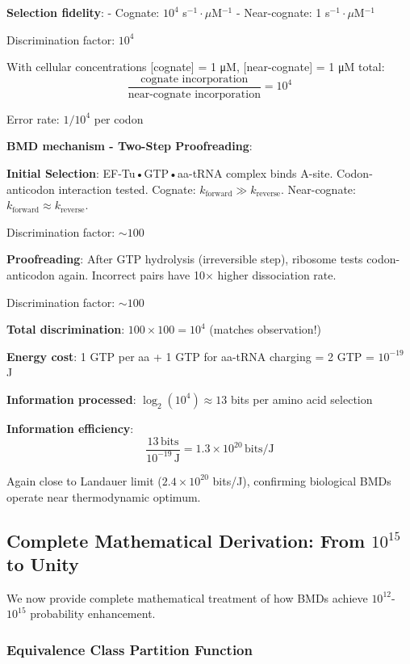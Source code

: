 \documentclass[11pt,onecolumn]{article}
\begin{document}
\textbf{Selection fidelity}:
- Cognate: $10^4$ s$^{-1}\cdot\mu$M$^{-1}$
- Near-cognate: 1 s$^{-1}\cdot\mu$M$^{-1}$

Discrimination factor: $10^4$

With cellular concentrations [cognate] = 1 μM, [near-cognate] = 1 μM total:
\begin{equation}
\frac{\text{cognate incorporation}}{\text{near-cognate incorporation}} = 10^4
\end{equation}

Error rate: $1/10^4$ per codon

\textbf{BMD mechanism - Two-Step Proofreading}:

\textbf{Initial Selection}: EF-Tu•GTP•aa-tRNA complex binds A-site. Codon-anticodon interaction tested. Cognate: $k_{\text{forward}} \gg k_{\text{reverse}}$. Near-cognate: $k_{\text{forward}} \approx k_{\text{reverse}}$.

Discrimination factor: $\sim 100$

\textbf{Proofreading}: After GTP hydrolysis (irreversible step), ribosome tests codon-anticodon again. Incorrect pairs have 10$\times$ higher dissociation rate.

Discrimination factor: $\sim 100$

\textbf{Total discrimination}: $100 \times 100 = 10^4$ (matches observation!)

\textbf{Energy cost}: 1 GTP per aa + 1 GTP for aa-tRNA charging = 2 GTP = $10^{-19}$ J

\textbf{Information processed}: $\log_2(10^4) \approx 13$ bits per amino acid selection

\textbf{Information efficiency}:
\begin{equation}
\frac{13\,\text{bits}}{10^{-19}\,\text{J}} = 1.3 \times 10^{20}\,\text{bits/J}
\end{equation}

Again close to Landauer limit ($2.4 \times 10^{20}$ bits/J), confirming biological BMDs operate near thermodynamic optimum.

\subsection{Complete Mathematical Derivation: From $10^{15}$ to Unity}

We now provide complete mathematical treatment of how BMDs achieve $10^{12}$-$10^{15}$ probability enhancement.

\subsubsection{Equivalence Class Partition Function}
\end{document}
